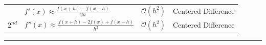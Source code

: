 \documentclass[
]{book}
\theoremstyle{definition}
\theoremstyle{definition}
\theoremstyle{definition}
\theoremstyle{remark}
\begin{document}
\begin{longtable}[]{@{}llll@{}}
\begin{minipage}[t]{0.34\columnwidth}
\end{minipage} & \begin{minipage}[t]{0.24\columnwidth}\raggedright
\(f'(x) \approx \frac{f(x+h) - f(x-h)}{2h}\)\strut
\end{minipage} & \begin{minipage}[t]{0.17\columnwidth}\raggedright
\(\mathcal{O}(h^2)\)\strut
\end{minipage} & \begin{minipage}[t]{0.14\columnwidth}\raggedright
Centered Difference\strut
\end{minipage}\tabularnewline
\begin{minipage}[t]{0.34\columnwidth}\raggedright
\(2^{nd}\)\strut
\end{minipage} & \begin{minipage}[t]{0.24\columnwidth}\raggedright
\(f''(x) \approx \frac{f(x+h) - 2f(x) + f(x-h)}{h^2}\)\strut
\end{minipage} & \begin{minipage}[t]{0.17\columnwidth}\raggedright
\(\mathcal{O}(h^2)\)\strut
\end{minipage} & \begin{minipage}[t]{0.14\columnwidth}\raggedright
Centered Difference\strut
\end{minipage}\tabularnewline
\bottomrule
\end{longtable}

\begin{center}\rule{0.5\linewidth}{0.5pt}\end{center}
\end{document}
